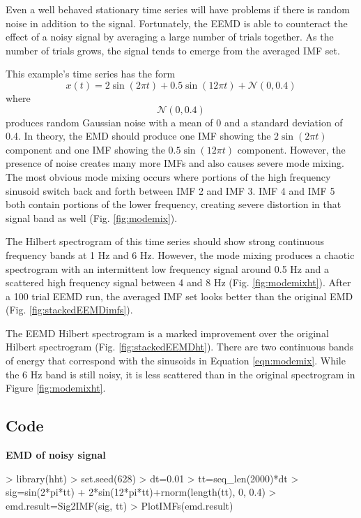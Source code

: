 \documentclass[12pt]{article}
\begin{document}
Even a well behaved stationary time series will have problems if there is random noise in addition to the signal.
Fortunately, the EEMD is able to counteract the effect of a noisy signal by averaging a large number of trials together.
As the number of trials grows, the signal tends to emerge from the averaged IMF set.

This example's time series has the form
\begin{equation}
\label{eqn:modemix}
x (t) = 2 \sin(2\pi t) + 0.5\sin(12\pi t) + \mathcal{N}(0, 0.4)
\end{equation}
where 
\begin{equation*}
\mathcal{N}(0, 0.4)
\end{equation*}
produces random Gaussian noise with a mean of 0 and a standard deviation of 0.4.
In theory, the EMD should produce one IMF showing the $2 \sin(2\pi t)$ component and one IMF showing the $0.5\sin(12\pi t)$ component.
However, the presence of noise creates many more IMFs and also causes severe mode mixing.
The most obvious mode mixing occurs where portions of the high frequency sinusoid switch back and forth between IMF 2 and IMF 3.
IMF 4 and IMF 5 both contain portions of the lower frequency, creating severe distortion in that signal band as well (Fig. \ref{fig:modemix}).

The Hilbert spectrogram of this time series should show strong continuous frequency bands at 1 Hz and 6 Hz.
However, the mode mixing produces a chaotic spectrogram with an intermittent low frequency signal around 0.5 Hz and a scattered high frequency signal between 4 and 8 Hz (Fig. \ref{fig:modemixht}).
After a 100 trial EEMD run, the averaged IMF set looks better than the original EMD (Fig. \ref{fig:stackedEEMDimfs}).

The EEMD Hilbert spectrogram is a marked improvement over the original Hilbert spectrogram (Fig. \ref{fig:stackedEEMDht}).
There are two continuous bands of energy that correspond with the sinusoids in Equation \ref{eqn:modemix}.
While the 6 Hz band is still noisy, it is less scattered than in the original spectrogram in Figure \ref{fig:modemixht}.

\subsection{Code}

\textbf{EMD of noisy signal}
\begin{Schunk}
\begin{Sinput}
> library(hht)
> set.seed(628)
> dt=0.01
> tt=seq_len(2000)*dt
> sig=sin(2*pi*tt) + 2*sin(12*pi*tt)+rnorm(length(tt), 0, 0.4)
> emd.result=Sig2IMF(sig, tt)
> PlotIMFs(emd.result)
\end{Sinput}
\end{Schunk}
\end{document}
